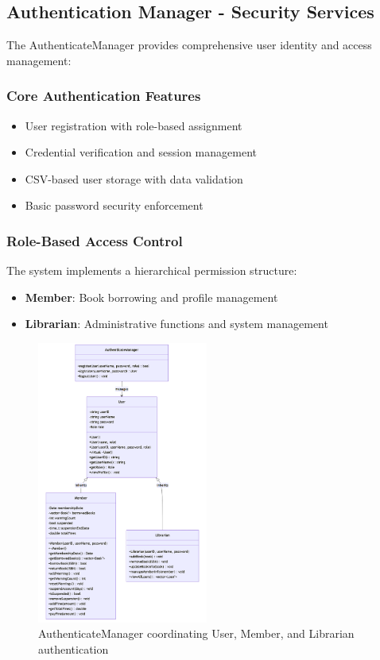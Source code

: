 \subsection{Authentication Manager - Security Services}

The AuthenticateManager provides comprehensive user identity and access management:

\subsubsection{Core Authentication Features}
\begin{itemize}
	\item User registration with role-based assignment
	\item Credential verification and session management
	\item CSV-based user storage with data validation
	\item Basic password security enforcement
\end{itemize}

\subsubsection{Role-Based Access Control}
The system implements a hierarchical permission structure:
\begin{itemize}
	\item \textbf{Member}: Book borrowing and profile management
	\item \textbf{Librarian}: Administrative functions and system management
\end{itemize}

\begin{figure}[H]
	\centering
	\includegraphics[width=0.5\textwidth]{figures/authenticate.png}
	\caption{AuthenticateManager coordinating User, Member, and Librarian authentication}
	\label{fig:auth-manager-service}
\end{figure}

